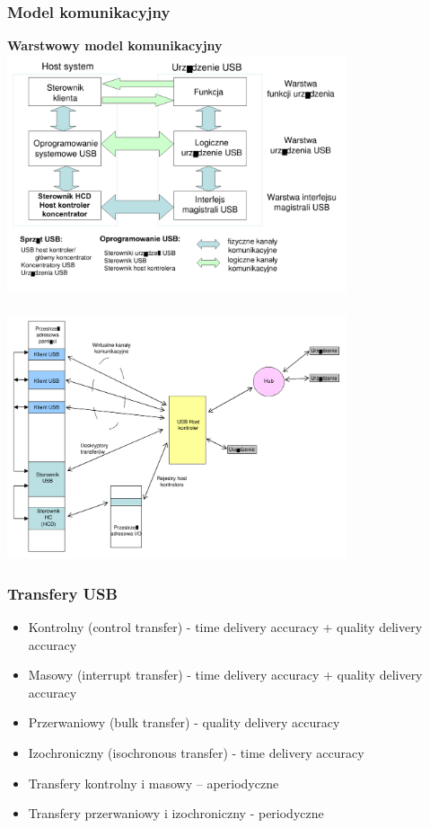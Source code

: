 		\subsubsection{Model komunikacyjny}
		\textbf{Warstwowy model komunikacyjny}\\
		\includegraphics[width=10cm]{./wyklady/USB_12_1.pdf}\\\\
		\includegraphics[width=10cm]{./wyklady/USB_13_1.pdf}\\
		\subsubsection{Transfery USB}
		\begin{itemize}
			\item Kontrolny (control transfer) - time delivery accuracy + quality delivery accuracy
			\item Masowy (interrupt transfer) - time delivery accuracy + quality delivery accuracy
			\item Przerwaniowy (bulk transfer) - quality delivery accuracy
			\item Izochroniczny (isochronous transfer) - time delivery accuracy
		\end{itemize}
		\begin{itemize}
			\item Transfery kontrolny i masowy – aperiodyczne
			\item Transfery przerwaniowy i izochroniczny - periodyczne
		\end{itemize}
